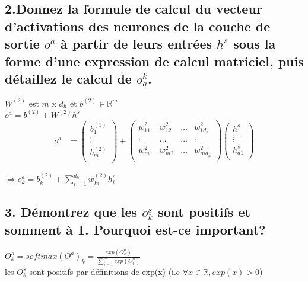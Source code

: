 \documentclass[12pt]{article}
\begin{document}
\subsection{2.Donnez la formule de calcul du
vecteur d'activations des neurones de la couche de sortie $o^{a}$ à partir de
leurs entrées $h^{s}$ sous la forme d'une expression de calcul matriciel, puis
détaillez le calcul de $o_{a}^{k}$.}

$W^{(2)}$ est $m$ x $d_{h}$ et $b^{(2)} \in  \mathbb{R}^{m}$\\
$o^{a} = b^{(2)} + W^{(2)}h^{s}$ \\
\begin{align*} 
  o^{a}
    &=
    \left(
      \begin{array}{r}
        b_{1}^{(1)} \\
          \vdots \\
          b_{m}^{(2)} \\
      \end{array}
     \right) + 
     \left(
       \begin{array}{rrrr}
         w_{11}^{2} &   w_{12}^{2} &   \dots &    w_{1d_{h}}^{2} \\
        \vdots &  \dots &   \dots&   \vdots \\
         w_{m1}^{2} &   w_{m2}^{2} &   \dots &    w_{md_{h}}^{2}   \\
       \end{array}
      \right) 
      \left(
        \begin{array}{r}
        h_{1}^{s} \\
          \vdots \\
          h_{d1}^{s} \\
        \end{array}
      \right)
\end{align*}

$\Rightarrow o_{k}^{a} = b_{k}^{(2)} + \sum_{i=1}^{d_{h}}w_{ki}^{(2)}h_{i}^{s}$

\subsection{3. Démontrez que les $o_{k}^{s}$ sont positifs et somment à 1. Pourquoi est-ce important?}

$O_{k}^{s} = softmax(O^{a})_{k} = \frac{exp(O_{k}^{a})}{\sum_{i=1}^{m}exp(O_{i}^{a})}$ \\
les $O_{k}^{s}$ sont positifs par définitions de exp(x) (i.e $\forall x \in \mathbb{R}, exp(x) > 0$)\\
\end{document}
